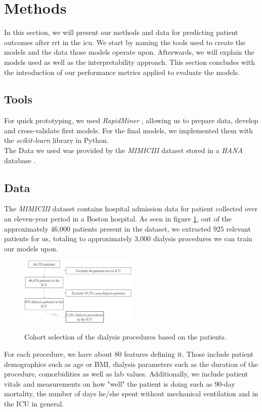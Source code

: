 \documentclass[conference,comsoc]{IEEEtran}
\begin{document}
\section{Methods}
\label{sec:methods}
In this section, we will present our methods and data for predicting patient outcomes after \gls{rrt} in the \gls{icu}.
We start by naming the tools used to create the models and the data those models operate upon.
Afterwards, we will explain the models used as well as the interpretability approach.
This section concludes with the introduction of our performance metrics applied to evaluate the models.

\subsection{Tools}
For quick prototyping, we used \emph{RapidMiner} \cite{RapidMiner}, allowing us to prepare data, develop and cross-validate first models. 
For the final models, we implemented them with the \emph{scikit-learn} library \cite{SKLearn} in Python. \\
The Data we used was provided by the \emph{MIMICIII} dataset \cite{Johnson2016} stored in a \emph{HANA} database \cite{Farber2012}.


\subsection{Data}
The \emph{MIMICIII} dataset contains hospital admission data for patient collected over an eleven-year period in a Boston hospital. 
As seen in figure \ref{fig:cohort}, out of the approximately 46,000 patients present in the dataset, we extracted 925 relevant patients for us, totaling to approximately 3,000 dialysis procedures we can train our models upon.

\begin{figure}[h]
	\includegraphics[width=0.5\textwidth]{cohort.jpg}
	\label{fig:cohort}
	\caption{Cohort selection of the dialysis procedures based on the patients.}
\end{figure}

For each procedure, we have about 80 features defining it. 
Those include patient demographics such as age or BMI, dialysis parameters such as the duration of the procedure, comorbidities as well as lab values. 
Additionally, we include patient vitals and measurements on how "well" the patient is doing such as 90-day mortality, the number of days he/she spent without mechanical ventilation and in the ICU in general.
\end{document}
